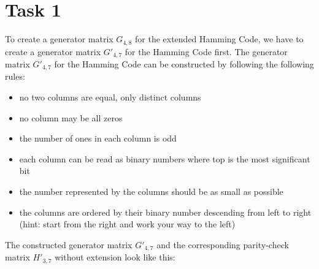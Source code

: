 \section*{Task 1}

To create a generator matrix $G_{4,8}$ for the extended Hamming Code, we have to create a generator matrix $G'_{4,7}$ for the Hamming Code first. The generator matrix $G'_{4,7}$ for the Hamming Code can be constructed by following the following rules:
\begin{itemize}
  \item no two columns are equal, only distinct columns
  \item no column may be all zeros
  \item the number of ones in each column is odd
  \item each column can be read as binary numbers where top is the most significant bit
  \item the number represented by the columns should be as small as possible
  \item the columns are ordered by their binary number descending from left to right (hint: start from the right and work your way to the left)
\end{itemize}


The constructed generator matrix $G'_{4,7}$ and the corresponding parity-check matrix $H'_{3,7}$ without extension look like this:

